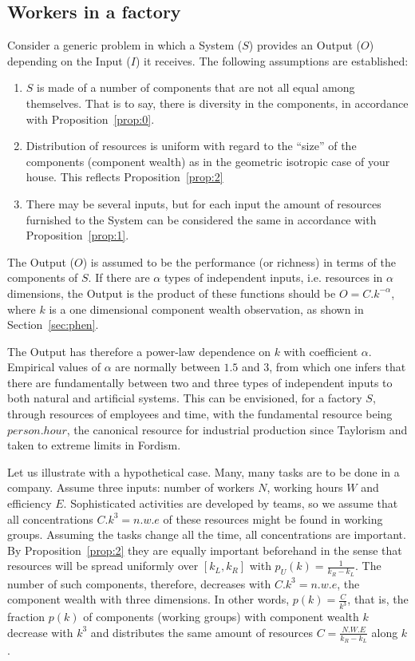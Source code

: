 \documentclass[a4paper, 11pt]{article} %
\begin{document}
\subsection{Workers in a factory}
Consider a generic problem in which a System ($S$) provides an Output ($O$) depending on the Input ($I$) it receives.
The following assumptions are established:
\begin{enumerate}
	\item $S$ is made of a number of components that are not all equal among themselves.
That is to say, there is diversity in the components, in accordance with Proposition~\ref{prop:0}. 
\item Distribution of resources is uniform with regard to the ``size'' of the components (component wealth) as in the geometric isotropic case of your house.
This reflects Proposition~\ref{prop:2}
\item There may be several inputs, but for each input the amount of resources furnished to the System can be considered the same 
	in accordance with Proposition~\ref{prop:1}.
\end{enumerate}

The Output ($O$)
is assumed to be the performance (or richness) in terms of the components of $S$.
If there are $\alpha$ types of independent inputs, i.e. resources in $\alpha$ dimensions,
the Output is the product of these functions should be
$O =C.k^{-\alpha}$, where $k$ is a one dimensional component wealth observation,
as shown in Section~\ref{sec:phen}. 

The Output has therefore a power-law dependence on $k$ with coefficient $\alpha$. 
Empirical values of $\alpha$
are normally between $1.5$ and $3$,
from which one infers that there are 
fundamentally between two and three types
of independent inputs to both natural and artificial systems.
This can be envisioned, for a factory $S$, through resources
of employees and time, with the fundamental resource being 
$person . hour$, the canonical resource for 
industrial production since Taylorism
and taken to extreme limits in Fordism.

Let us illustrate with a hypothetical case.
Many, many tasks are to be done in a company.
Assume three inputs:
number of workers $N$, working hours $W$
and efficiency $E$.
Sophisticated activities are developed by teams,
so we assume that all concentrations $C.k^3=n.w.e$
of these resources might be found in working groups.
Assuming the tasks change all the time,
all concentrations are important.
By Proposition~\ref{prop:2} they are equally important beforehand
in the sense that 
resources will be spread uniformly over $[k_L,k_R]$
with $p_U(k)=\frac{1}{k_R-k_L}$.
The number of such components, therefore,
decreases with $C.k^3=n.w.e$, the component wealth with three dimensions.
In other words,
$p(k)=\frac{C}{k^3}$, that is,
the fraction $p(k)$ of components (working groups) with component wealth $k$
decrease with $k^3$ and distributes the same
amount of resources $C=\frac{N.W.E}{k_R-k_L}$ along $k$.
\end{document}

